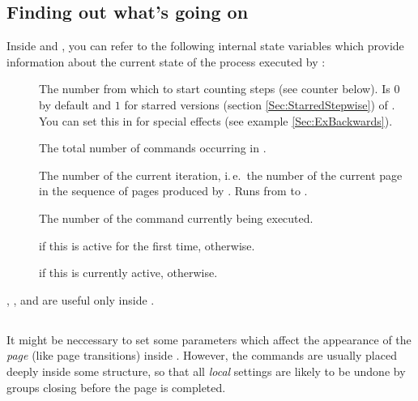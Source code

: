   \subsection{Finding out what's going on}\label{Sec:Internals}%
  Inside  and , you can refer to the following internal state variables which provide
  information about the current state of the process executed by :
  \begin{description}
  \item[] The number from which to start counting steps (see counter 
    below). Is $0$ by default and $1$ for starred versions (section \ref{Sec:StarredStepwise}) of .
    You can set this in  for special effects (see example \ref{Sec:ExBackwards}).

  \item[] The total number of  commands occurring in .
    
    \newslide

  \item[] The number of the current iteration, i.\,e.\ the number of the current page in
    the sequence of pages produced by . Runs from  to
    .

  \item[] The number of the  command currently being executed.

  \item[]  if this  is active for the first time,
     otherwise.

  \item[]  if this  is currently active, 
    otherwise.
  \end{description}
  , , and  are useful only inside .


  \newslide

  \subsection{}%
  It might be neccessary to set some parameters which affect the appearance of the \emph{page} (like page transitions)
  inside . However, the  commands are usually placed deeply inside some structure, so
  that all \emph{local} settings are likely to be undone by groups closing before the page is completed.

